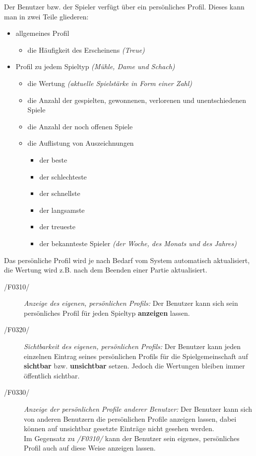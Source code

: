 Der Benutzer bzw. der Spieler verfügt über ein persönliches Profil.
Dieses kann man in zwei Teile gliederen:
\begin{itemize}
  \item allgemeines Profil
    \begin{itemize}
      \item die Häufigkeit des Erscheinens \textit{(Treue)}
    \end{itemize}
  \item Profil zu jedem Spieltyp \textit{(Mühle, Dame und Schach)}
    \begin{itemize}
      \item die Wertung \textit{(aktuelle Spielstärke in Form einer Zahl)}
      \item die Anzahl der gespielten, gewonnenen, verlorenen und unentschiedenen Spiele
      \item die Anzahl der noch offenen Spiele
      \item die Auflistung von Auszeichnungen
        \begin{itemize}
          \item der beste
          \item der schlechteste
          \item der schnellste
          \item der langsamste
          \item der treueste
          \item der bekannteste Spieler \textit{(der Woche, des Monats und des Jahres)}
        \end{itemize}
    \end{itemize}
\end{itemize}

Das persönliche Profil wird je nach Bedarf vom System automatisch aktualisiert, die Wertung wird z.B. nach dem Beenden einer Partie aktualisiert.

\begin{description}
  \item[/F0310/]
    \textit{Anzeige des eigenen, persönlichen Profils:}
    Der Benutzer kann sich sein persönliches Profil für jeden Spieltyp \textbf{anzeigen} lassen.
  \item[/F0320/]
    \textit{Sichtbarkeit des eigenen, persönlichen Profils:}
    Der Benutzer kann jeden einzelnen Eintrag seines persönlichen Profils für die Spielgemeinschaft auf \textbf{sichtbar} bzw.
    \textbf{unsichtbar} setzen.
    Jedoch die Wertungen bleiben immer öffentlich sichtbar.
  \item[/F0330/]
    \textit{Anzeige der persönlichen Profile anderer Benutzer:}
    Der Benutzer kann sich von anderen Benutzern die persönlichen Profile anzeigen lassen,
    dabei können auf unsichtbar gesetzte Einträge nicht gesehen werden.\\
    Im Gegensatz zu \textit{/F0310/} kann der Benutzer sein eigenes, persönliches Profil auch auf diese Weise anzeigen lassen.
\end{description}


